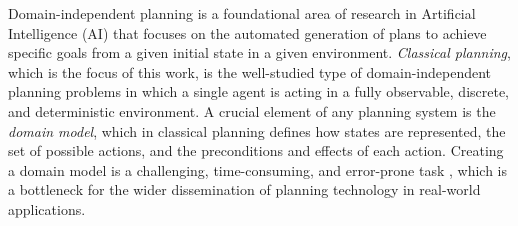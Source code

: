 \documentclass[letterpaper]{article} %
\newif\ifaddcomments
\newcommand{\roni}[1]{\ifaddcomments{\textcolor{red}{[Roni: #1]}}\fi}
\newcommand{\pascalJr}[1]{\ifaddcomments{\textcolor{cyan}{[Pascal L.: {#1}]}}\fi}
\begin{document}
Domain-independent planning is a foundational area of research in Artificial Intelligence (AI) that focuses on the automated generation of plans to achieve specific goals from a given initial state in a given environment. 
\emph{Classical planning}, which is the focus of this work, is the well-studied type of domain-independent planning problems in which a single agent is acting in a fully observable, discrete, and deterministic environment. 
A crucial element of any planning system is the \emph{domain model}, which in classical planning defines how states are represented, the set of possible actions, and the preconditions and effects of each action. 
Creating a domain model is a challenging, time-consuming, and error-prone task \citep{DBLP:conf/kcap/McCluskeyVV17}, which is a bottleneck for the wider dissemination of planning technology in real-world applications. 
\end{document}
